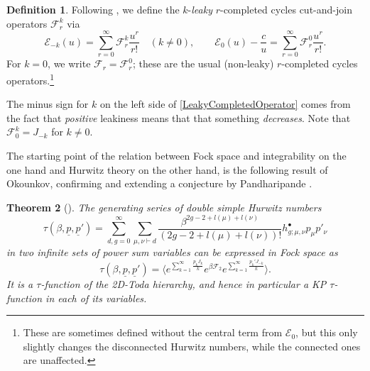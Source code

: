 \documentclass[10pt,a4paper,oneside,no-math,reqno]{amsart}%
\theoremstyle{plain}
\newtheorem{theorem}{Theorem}[section]
\theoremstyle{definition}
\newtheorem{definition}[theorem]{Definition}
\theoremstyle{remark}
\numberwithin{equation}{section}
\newcommand{\mc}[1]{\mathcal{#1}}
\newcommand{\1}{\mathds{1}}
\newcommand{\<}{\langle}
\renewcommand{\>}{\rangle}
\begin{document}
\begin{definition}
    Following \cite{AKL25}, we define the $k$-\emph{leaky} $r$-completed cycles cut-and-join operators $\mathcal{F}_r^k$ via
    \begin{equation}\label{LeakyCompletedOperator}
        \mathcal{E}_{-k} (u)
        =
        \sum_{r=0}^\infty\mathcal{F}^k_r\frac{u^r}{r!}
        \quad (k\ne0),
        \qquad
        \mathcal{E}_{0} (u) - \frac{c}{u}
        =
        \sum_{r=0}^\infty\mathcal{F}^0_r\frac{u^r}{r!}.
    \end{equation}
    For $k = 0$, we write $ \mc{F}_r = \mc{F}_r^0$; these are the usual (non-leaky) $r$-completed cycles operators.\footnote{These are sometimes defined without the central term from $ \mc{E}_0$, but this only slightly changes the disconnected Hurwitz numbers, while the connected ones are unaffected.}
\end{definition}

The minus sign for $k $ on the left side of \cref{LeakyCompletedOperator} comes from the fact that \emph{positive} leakiness means that that something \emph{decreases}. 
Note that $ \mc{F}_0^k = J_{-k}$ for $k\ne0$.

The starting point of the relation between Fock space and integrability on the one hand and Hurwitz theory on the other hand, is the following result of Okounkov, confirming and extending a conjecture by Pandharipande \cite{Pan00}.

\begin{theorem}[{\cite{Ok00}}]
    The generating series of double simple Hurwitz numbers
    \begin{equation}
        \tau ( \beta, \underline{p}, \underline{p}')
        =
        \sum_{d, g = 0}^\infty \sum_{\mu, \nu \vdash d} \frac{\beta^{2g-2+ l(\mu) + l (\nu) }}{(2g-2+l(\mu) + l(\nu))!} h^\bullet_{g;\mu, \nu} p_{\mu} p'_\nu
    \end{equation}
    in two infinite sets of power sum variables can be expressed in Fock space as
    \begin{equation}\label{SimpeHurwitzFS}
        \tau ( \beta, \underline{p}, \underline{p}')
        =
        \Big\< e^{\sum_{k=1}^\infty \frac{p_k J_k}{k}} e^{\beta \mc{F}_2} e^{\sum_{k=1}^\infty \frac{p_k' J_{-k}}{k}}\Big\> .
    \end{equation}
    It is a $\tau$-function of the 2D-Toda hierarchy, and hence in particular a KP $\tau$-function in each of its variables.
\end{theorem}
\end{document}
